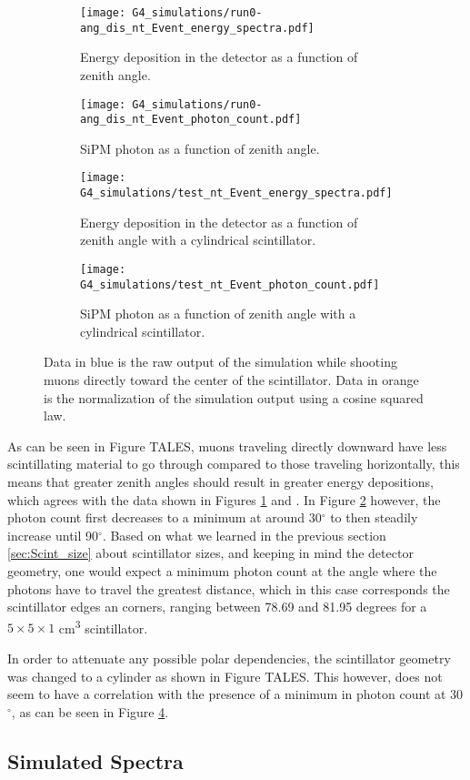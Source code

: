 \begin{figure}[H]
  \centering
  \begin{subfigure}[t]{0.48\textwidth}
    \texttt{[image: G4\_simulations/run0-ang\_dis\_nt\_Event\_energy\_spectra.pdf]}
    \caption{\label{sfig:ang_edep}Energy deposition in the detector as a function of zenith angle.}
  \end{subfigure}
  \hfill
  \begin{subfigure}[t]{0.48\textwidth}
    \texttt{[image: G4\_simulations/run0-ang\_dis\_nt\_Event\_photon\_count.pdf]}
    \caption{\label{sfig:ang_pcount}SiPM photon as a function of zenith angle.}
  \end{subfigure}
  \medskip
  \begin{subfigure}[t]{0.48\textwidth}
    \texttt{[image: G4\_simulations/test\_nt\_Event\_energy\_spectra.pdf]}
    \caption{\label{sfig:ang_edep_cylinder}Energy deposition in the detector as a function of zenith angle with a cylindrical scintillator.}
  \end{subfigure}
  \hfill
  \begin{subfigure}[t]{0.48\textwidth}
    \texttt{[image: G4\_simulations/test\_nt\_Event\_photon\_count.pdf]}
    \caption{\label{sfig:ang_pcount_cylinder}SiPM photon as a function of zenith angle with a cylindrical scintillator.}
  \end{subfigure}
  \caption{\label{fig:ang_results}Data in blue is the raw output of the simulation while shooting muons directly toward the center of the scintillator. Data in orange is the normalization of the simulation output using a cosine squared law.}
\end{figure}

As can be seen in Figure TALES, muons traveling directly downward have less scintillating material to go through compared to those traveling horizontally, this means that greater zenith angles should result in greater energy depositions, which agrees with the data shown in Figures \ref{sfig:ang_edep} and . In Figure \ref{sfig:ang_pcount} however, the photon count first decreases to a minimum at around 30$^\circ$ to then steadily increase until 90$^\circ$. Based on what we learned in the previous section \ref{sec:Scint_size} about scintillator sizes, and keeping in mind the detector geometry, one would expect a minimum photon count at the angle where the photons have to travel the greatest distance, which in this case corresponds the scintillator edges an corners, ranging between 78.69 and 81.95 degrees for a $5\times5\times1$ \unit{\cm\cubed} scintillator.

In order to attenuate any possible polar dependencies, the scintillator geometry was changed to a cylinder as shown in Figure TALES. This however, does not seem to have a correlation with the presence of a minimum in photon count at 30$^\circ$, as can be seen in Figure \ref{sfig:ang_pcount_cylinder}.

\subsection{Simulated Spectra}